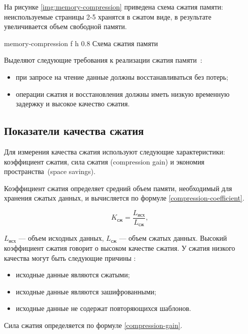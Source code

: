 На рисунке \ref{img:memory-compression} приведена схема сжатия памяти: неиспользуемые страницы 2-5 хранятся в сжатом виде, в результате увеличивается объем свободной памяти.

    {memory-compression}
    {f}
    {h}
    {0.8\textwidth}
    {Схема сжатия памяти}

Выделяют следующие требования к реализации сжатия памяти~\cite{compression-requirements}:

\begin{itemize}
	\item при запросе на чтение данные должны восстанавливаться без потерь;
	\item операции сжатия и восстановления должны иметь низкую временную задержку и высокое качество сжатия.
\end{itemize}

\subsection{Показатели качества сжатия}\label{compression-indicators}

Для измерения качества сжатия используют следующие характеристики: коэффициент сжатия, сила сжатия (compression gain) и экономия пространства~(space savings).

Коэффициент сжатия определяет средний объем памяти, необходимый для хранения сжатых данных, и вычисляется по формуле \ref{compression-coefficient}.

\begin{equation}\label{compression-coefficient}
	K_{\text{сж}} = \frac{L_{\text{исх}}}{L_{\text{сж}}},
\end{equation}

 $L_{\text{исх}}$ --- объем исходных данных, $L_{\text{сж}}$ --- объем сжатых данных. Высокий коэффициент сжатия говорит о высоком качестве сжатия. У сжатия низкого качества могут быть следующие причины \cite{bad-compression}:

\begin{itemize}
    \item исходные данные являются сжатыми;
    \item исходные данные являются зашифрованными;
    \item исходные данные не содержат повторяющихся шаблонов.
\end{itemize}

Сила сжатия определяется по формуле \ref{compression-gain}.

